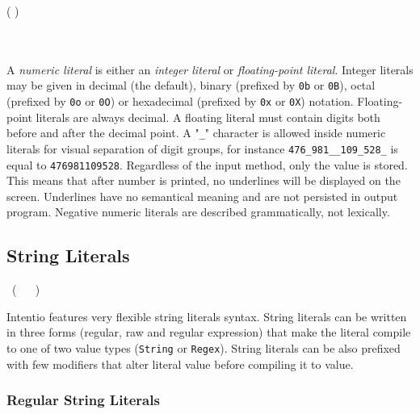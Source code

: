 \begin{bnf}
   \eq (  \gor {} ) \ \gtry{ \term{+} \gor \term{-} } \ \gmany{\term{\_}} \  \\
  \\
   \eq    {} \  \  \ 
             \gorln {} \ 
\end{bnf}

A \emph{numeric literal} is either an \emph{integer literal} or \emph{floating-point literal}. Integer literals may be given in decimal (the default), binary (prefixed by \texttt{0b} or \texttt{0B}), octal (prefixed by \texttt{0o} or \texttt{0O}) or hexadecimal (prefixed by \texttt{0x} or \texttt{0X}) notation. Floating-point literals are always decimal. A floating literal must contain digits both before and after the decimal point. A "\texttt{\_}" character is allowed inside numeric literals for visual separation of digit groups, for instance \lstinline{476_981__109_528_} is equal to \lstinline{476981109528}. Regardless of the input method, only the value is stored. This means that after number is printed, no underlines will be displayed on the screen. Underlines have no semantical meaning and are not persisted in output program. Negative numeric literals are described grammatically, not lexically.

\subsection{String Literals}

\begin{bnf}
   \eq {} \ ( \  \gor {} \gor {} \ )
\end{bnf}

Intentio features very flexible string literals syntax. String literals can be written in three forms (regular, raw and regular expression) that make the literal compile to one of two value types (\lstinline{String} or \lstinline{Regex}). String literals can be also prefixed with few modifiers that alter literal value before compiling it to value.

\subsubsection*{Regular String Literals}

